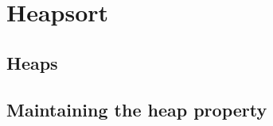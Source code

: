 \chapter{Heapsort}
\section{Heaps}
\renewcommand{\thesubsection}{Exercise \thesection-\arabic{subsection}}
\subsection{}

\subsection{}

\subsection{}

\subsection{}

\subsection{}

\subsection{}

\subsection{}

\section{Maintaining the heap property}
\subsection{}

\subsection{}

\subsection{}

\subsection{}

